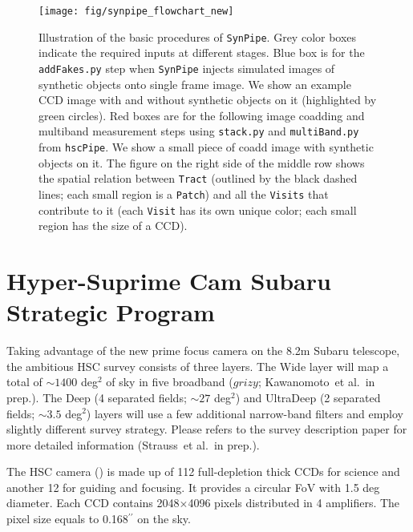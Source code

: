\documentclass[useamsfonts]{pasj01}
\def\asec{$^{\prime\prime}$}
\def\etal{{\ et al.~}}
\def\hscpipe{\texttt{hscPipe}}
\def\synpipe{\texttt{SynPipe}}
\def\tract{\texttt{Tract}}
\def\visit{\texttt{Visit}}
\def\visits{\texttt{Visits}}
\begin{document}
\begin{figure}
    \begin{center}
        \texttt{[image: fig/synpipe\_flowchart\_new]}
    \end{center}
    \caption{
        Illustration of the basic procedures of \synpipe{}.
        Grey color boxes indicate the required inputs at different stages.
        Blue box is for the \texttt{addFakes.py} step when \synpipe{} injects simulated
        images of synthetic objects onto single frame image.
        We show an example CCD image with and without synthetic objects on it
        (highlighted by green circles).
        Red boxes are for the following image coadding and multiband measurement steps
        using \texttt{stack.py} and \texttt{multiBand.py} from \hscpipe{}.
        We show a small piece of coadd image with synthetic objects on it.
        The figure on the right side of the middle row shows the spatial relation
        between \tract{} (outlined by the black dashed lines; each small region
        is a \texttt{Patch}) and all the \visits{} that contribute to it
        (each \visit{} has its own unique color; each small region has the size
        of a CCD).
        }
    \label{fig:flowchart}
\end{figure}

\section{Hyper-Suprime Cam Subaru Strategic Program}
    \label{sec:ssp}

    Taking advantage of the new prime focus camera on the 8.2m Subaru telescope,
    the ambitious HSC survey consists of three layers.
    The Wide layer will map a total of ${\sim}1400$ deg$^2$ of sky in five broadband
    ($grizy$; Kawanomoto\etal in prep.).
    The Deep (4 separated fields; ${\sim}27$ deg$^2$) and UltraDeep (2 separated
    fields; ${\sim}3.5$ deg$^2$) layers will use a few additional narrow-band filters
    and employ slightly different survey strategy.
    Please refers to the survey description paper for more detailed information
    (Strauss\etal in prep.).

    The HSC camera (\citealt{Miyazaki2012}) is made up of 112 full-depletion thick CCDs
    for science and another 12 for guiding and focusing.
    It provides a circular FoV with 1.5 deg diameter.
    Each CCD contains 2048$\times$4096 pixels distributed in 4 amplifiers.
    The pixel size equals to 0.168\asec{} on the sky.
\end{document}
